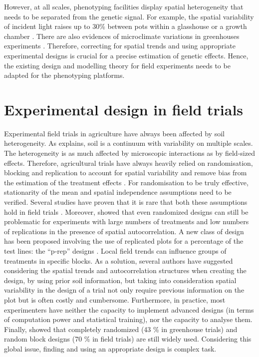 However, at all scales, phenotyping facilities display spatial heterogeneity that needs to be separated from the genetic signal. For example, the spatial variability of incident light raises up to 30\% between pots within a glasshouse or a growth chamber \parencite{cabrera-bosquet_high-throughput_2016}. There are also evidences of microclimate variations in greenhouses experiments \parencite{brien_accounting_2013}. Therefore, correcting for spatial trends and using appropriate experimental designs is crucial for a precise estimation of genetic effects. Hence, the existing design and modelling theory for field experiments needs to be adapted for the phenotyping platforms.\\

\section{Experimental design in field trials}
Experimental field trials in agriculture have always been affected by soil heterogeneity. As \textcite{van_es_1.2_2002} explains, soil is a continuum with variability on multiple scales. 
The heterogeneity is as much affected by microscopic interactions as by field-sized effects. 
Therefore, agricultural trials have always heavily relied on randomisation, blocking and replication to account for spatial variability and remove bias from the estimation of the treatment effects \parencite{atkinson_one_2001}. 
For randomisation to be truly effective, stationarity of the mean and spatial independence assumptions need to be verified. Several studies have proven that it is rare that both these assumptions hold in field trials \parencite{davidoff_method_1986,nielsen_spatial_1973,iqbal_spatial_2005}. 
Moreover, \textcite{van_es_spatial_1993} showed that even randomized designs can still be problematic for experiments with large numbers of treatments and low numbers of replications in the presence of spatial autocorrelation. A new class of design has been proposed involving the use of replicated plots for a percentage of the test lines: the “p-rep” designs \parencite{cullis_design_2006,velazco_modelling_2017}.
Local field trends can influence groups of treatments in specific blocks. As a solution, several authors \parencite{watson_spatial_2000,fagroud_accounting_2002} have suggested considering the spatial trends and autocorrelation structures when creating the design, by using prior soil information, but taking into consideration spatial variability in the design of a trial not only require previous information on the plot but is often costly and cumbersome. 
Furthermore, in practice, most experimenters have neither the capacity to implement advanced designs (in terms of computation power and statistical training), nor the capacity to analyse them. 
Finally, \textcite{van_es_spatially-balanced_2007} showed that completely randomized (43 \% in greenhouse trials) and random block designs (70 \% in field trials) are still widely used.
Considering this global issue, finding and using an appropriate design is complex task.

